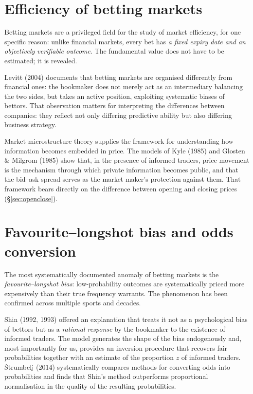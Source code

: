 \documentclass[12pt,a4paper,oneside]{report}
\renewcommand{\_}{\oldunderscore\allowbreak}
\theoremstyle{definition}
\theoremstyle{plain}
\theoremstyle{remark}
\begin{document}
\section{Efficiency of betting markets}

Betting markets are a privileged field for the study of market efficiency, for one specific
reason: unlike financial markets, every bet has \emph{a fixed expiry date and an objectively
verifiable outcome}. The fundamental value does not have to be estimated; it is revealed.

Levitt (2004) documents that betting markets are organised differently from financial ones:
the bookmaker does not merely act as an intermediary balancing the two sides, but takes an
active position, exploiting systematic biases of bettors. That observation matters for
interpreting the differences between companies: they reflect not only differing predictive
ability but also differing business strategy.

Market microstructure theory supplies the framework for understanding how information becomes
embedded in price. The models of Kyle (1985) and Glosten \& Milgrom (1985) show that, in the
presence of informed traders, price movement is the mechanism through which private
information becomes public, and that the bid--ask spread serves as the market maker's
protection against them. That framework bears directly on the difference between opening and
closing prices (\S\ref{sec:openclose}).

\section{Favourite--longshot bias and odds conversion}

The most systematically documented anomaly of betting markets is the
\emph{favourite--longshot bias}: low-probability outcomes are systematically priced more
expensively than their true frequency warrants. The phenomenon has been confirmed across
multiple sports and decades.

Shin (1992, 1993) offered an explanation that treats it not as a psychological bias of bettors
but as a \emph{rational response} by the bookmaker to the existence of informed traders. The
model generates the shape of the bias endogenously and, most importantly for us, provides an
inversion procedure that recovers fair probabilities together with an estimate of the
proportion $z$ of informed traders. Štrumbelj (2014) systematically compares methods for
converting odds into probabilities and finds that Shin's method outperforms proportional
normalisation in the quality of the resulting probabilities.
\end{document}
